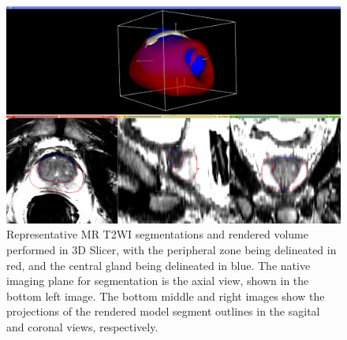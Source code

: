 \begin{figure}[htb!]
\centering
\includegraphics[width=1.0\textwidth]{figs/MR_P79_SegsVol.eps}
\caption{Representative MR T2WI segmentations and rendered volume performed in
    3D Slicer, with the peripheral zone being delineated in red, and the
    central gland being delineated in blue.  The native imaging plane for
    segmentation is the axial view, shown in the bottom left image.  The bottom
    middle and right images show the projections of the rendered model segment
    outlines in the sagital and coronal views, respectively.}
\label{fig:mr_segs_vol} 
\end{figure}
